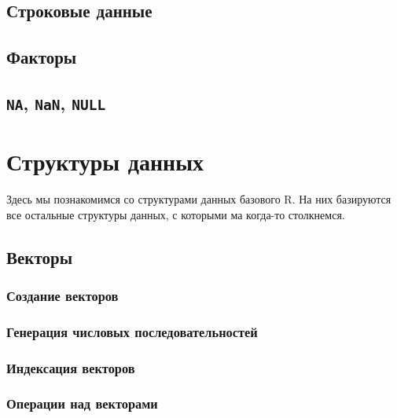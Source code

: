 \documentclass[
  letterpaper,
  DIV=11,
  numbers=noendperiod]{scrreprt}
\theoremstyle{definition}
\theoremstyle{remark}
\begin{document}
\section{Строковые данные}\label{rdtypes-strings}

\section{Факторы}\label{rdtypes-factors}

\section{\texorpdfstring{\texttt{NA}, \texttt{NaN},
\texttt{NULL}}{NA, NaN, NULL}}\label{rdtypes-na}


\chapter{Структуры данных}\label{rdstructs}

Здесь мы познакомимся со структурами данных базового R. На них
базируются все остальные структуры данных, с которыми ма когда-то
столкнемся.

\section{Векторы}\label{rdstructs-vectors}

\subsection{Создание векторов}\label{rdstructs-vectors-creation}

\subsection{Генерация числовых
последовательностей}\label{rdstructs-vectors-sequences}

\subsection{Индексация векторов}\label{rdstructs-vectors-indexing}

\subsection{Операции над
векторами}\label{rdstructs-vectors-manipulations}
\end{document}
